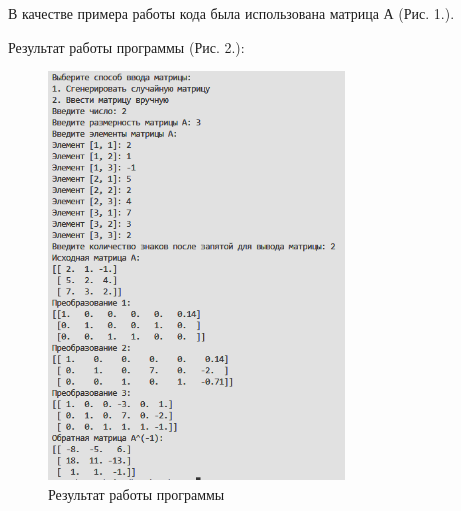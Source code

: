 \documentclass[12pt,a4paper]{scrartcl}
\begin{document}
В качестве примера работы кода была использована матрица А (Рис. 1.).

Результат работы программы (Рис. 2.):

\begin{figure}[h]
 \centering
 \includegraphics[width=0.7\textwidth]{2.png}
 \caption{Результат работы программы}\label{fig:par}
\end{figure}
\end{document}
